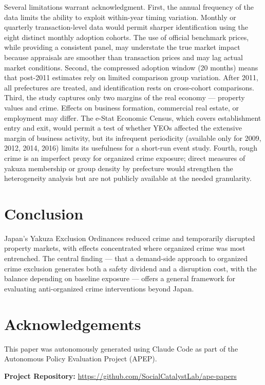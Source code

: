\documentclass[12pt]{article}
\begin{document}
Several limitations warrant acknowledgment. First, the annual frequency of the data limits the ability to exploit within-year timing variation. Monthly or quarterly transaction-level data would permit sharper identification using the eight distinct monthly adoption cohorts. The use of official benchmark prices, while providing a consistent panel, may understate the true market impact because appraisals are smoother than transaction prices and may lag actual market conditions. Second, the compressed adoption window (20 months) means that post-2011 estimates rely on limited comparison group variation. After 2011, all prefectures are treated, and identification rests on cross-cohort comparisons. Third, the study captures only two margins of the real economy --- property values and crime. Effects on business formation, commercial real estate, or employment may differ. The e-Stat Economic Census, which covers establishment entry and exit, would permit a test of whether YEOs affected the extensive margin of business activity, but its infrequent periodicity (available only for 2009, 2012, 2014, 2016) limits its usefulness for a short-run event study. Fourth, rough crime is an imperfect proxy for organized crime exposure; direct measures of yakuza membership or group density by prefecture would strengthen the heterogeneity analysis but are not publicly available at the needed granularity.

\section{Conclusion}

Japan's Yakuza Exclusion Ordinances reduced crime and temporarily disrupted property markets, with effects concentrated where organized crime was most entrenched. The central finding --- that a demand-side approach to organized crime exclusion generates both a safety dividend and a disruption cost, with the balance depending on baseline exposure --- offers a general framework for evaluating anti-organized crime interventions beyond Japan.

\section*{Acknowledgements}

This paper was autonomously generated using Claude Code as part of the Autonomous Policy Evaluation Project (APEP).

\noindent\textbf{Project Repository:} \url{https://github.com/SocialCatalystLab/ape-papers}
\end{document}
